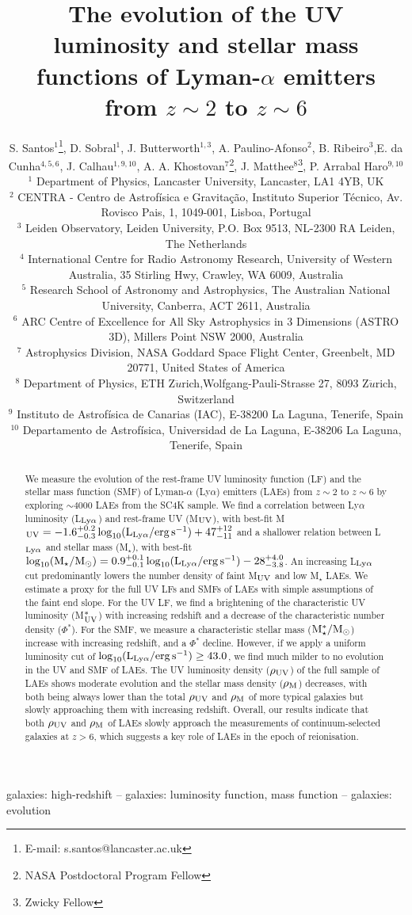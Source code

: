 \documentclass[a4paper,fleqn,usenatbib]{mnras}
\title[Evolution of the UV LF and SMF of LAEs]{The evolution of the UV luminosity and stellar mass functions of Lyman-$\alpha$ emitters from $z\sim2$ to $z\sim6$}
\author[Santos et al.]{S. Santos$^{1}$\thanks{E-mail: s.santos@lancaster.ac.uk}, D. Sobral$^{1}$, J. Butterworth$^{1,3}$, A. Paulino-Afonso$^{2}$, B. Ribeiro$^{3}$,\newauthor E. da Cunha$^{4,5,6}$, J. Calhau$^{1,9,10}$, A. A. Khostovan$^{7}$\thanks{NASA Postdoctoral Program Fellow}, J. Matthee$^{8}$\thanks{Zwicky Fellow}, P. Arrabal Haro$^{9,10}$\\ 
$^{1}$ Department of Physics, Lancaster University, Lancaster, LA1 4YB, UK\\
$^{2}$ CENTRA - Centro de Astrof\'{i}sica e Gravita\c{c}\~{a}o, Instituto Superior T\'{e}cnico, Av. Rovisco Pais, 1, 1049-001, Lisboa, Portugal\\
$^{3}$ Leiden Observatory, Leiden University, P.O. Box 9513, NL-2300 RA Leiden, The Netherlands\\
$^{4}$ International Centre for Radio Astronomy Research, University of Western Australia, 35 Stirling Hwy, Crawley, WA 6009, Australia \\
$^{5}$ Research School of Astronomy and Astrophysics, The Australian National University, Canberra, ACT 2611, Australia \\
$^{6}$ ARC Centre of Excellence for All Sky Astrophysics in 3 Dimensions (ASTRO 3D), Millers Point NSW 2000, Australia\\
$^{7}$ Astrophysics Division, NASA Goddard Space Flight Center, Greenbelt, MD 20771, United States of America\\
$^{8}$ Department of Physics, ETH Z$\ddot{u}$rich,Wolfgang-Pauli-Strasse 27, 8093 Z$\ddot{u}$rich, Switzerland\\
$^{9}$ Instituto de Astrof\'{i}sica de Canarias (IAC), E-38200 La Laguna, Tenerife, Spain\\
$^{10}$ Departamento de Astrof\'{i}sica, Universidad de La Laguna, E-38206 La Laguna, Tenerife, Spain}
\begin{document}
\label{firstpage}
\pagerange{\pageref{firstpage}--\pageref{lastpage}}
\maketitle

\begin{abstract}
We measure the evolution of the rest-frame UV luminosity function (LF) and the stellar mass function (SMF) of Lyman-$\alpha$ (Ly$\alpha$) emitters (LAEs) from $z\sim2$ to $z\sim6$ by exploring $\sim4000$ LAEs from the SC4K sample. We find a correlation between Ly$\alpha$ luminosity (L$_{\rm Ly\alpha}$) and rest-frame UV (M$_{\rm UV}$), with best-fit M$_{\rm UV}=-1.6_{-0.3}^{+0.2}\log_{10} (\rm L_{Ly\alpha}/erg\,s^{-1})+47_{-11}^{+12}$ and a shallower relation between L$_{\rm Ly\alpha}$ and stellar mass (M$_\star$), with best-fit $\log_{10} (\rm M_\star/M_\odot)=0.9_{-0.1}^{+0.1}\log_{10} (\rm L_{Ly\alpha}/erg\,s^{-1})-28_{-3.8}^{+4.0}$. An increasing L$_{\rm Ly\alpha}$ cut predominantly lowers the number density of faint M$_{\rm UV}$ and low M$_\star$ LAEs. We estimate a proxy for the full UV LFs and SMFs of LAEs with simple assumptions of the faint end slope. For the UV LF, we find a brightening of the characteristic UV luminosity (M$_{\rm UV}^*$) with increasing redshift and a decrease of the characteristic number density ($\Phi^*$). For the SMF, we measure a characteristic stellar mass (${\rm M_\star^*/M_\odot}$) increase with increasing redshift, and a  $\Phi^*$ decline. However, if we apply a uniform luminosity cut of $\log_{10} (\rm L_{Ly\alpha}/erg\,s^{-1}) \geq 43.0$, we find much milder to no evolution in the UV and SMF of LAEs. The UV luminosity density ($\rho_{\rm UV}$) of the full sample of LAEs shows moderate evolution and the stellar mass density ($\rho_{\rm M}$) decreases, with both being always lower than the total $\rho_{\rm UV}$ and $\rho_{\rm M}$ of more typical galaxies but slowly approaching them with increasing redshift. Overall, our results indicate that both $\rho_{\rm UV}$ and $\rho_{\rm M}$ of LAEs slowly approach the measurements of continuum-selected galaxies at $z>6$, which suggests a key role of LAEs in the epoch of reionisation.
\end{abstract}

\begin{keywords}
galaxies: high-redshift -- galaxies: luminosity function, mass function  -- galaxies: evolution

\end{keywords}
\end{document}
